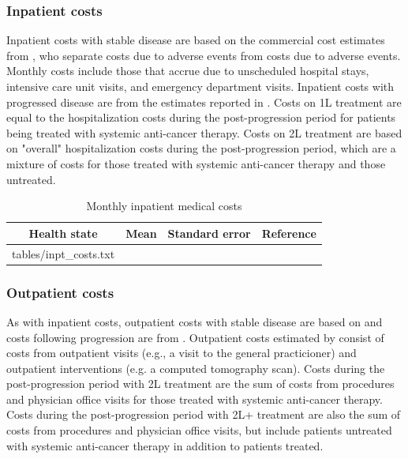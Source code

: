 \documentclass[11pt,final,fleqn]{article}\usepackage[]{graphicx}\usepackage[]{color}
\makeatletter
\theoremstyle{plain}
\newcommand*\ExpandableInput[1]{\@@input#1 }
\makeatother
\begin{document}
{\subsubsection{Inpatient costs}
Inpatient costs with stable disease are based on the commercial cost estimates from \citet{graham2018budget}, who separate costs due to adverse events from costs due to adverse events. Monthly costs include those that accrue due to unscheduled hospital stays, intensive care unit visits, and emergency department visits. Inpatient costs with progressed disease are from the estimates reported in \citet{skinner2018healthcare}. Costs on 1L treatment are equal to the hospitalization costs during the post-progression period for patients being treated with systemic anti-cancer therapy. Costs on 2L treatment are based on "overall" hospitalization costs during the post-progression period, which are a mixture of costs for those treated with systemic anti-cancer therapy and those untreated.    

\begin{table}[!ht]
\begin{center}
\begin{threeparttable}
\caption{Monthly inpatient medical costs} \label{tbl:inpt-costs}
\begin{tabularx}{\textwidth}{@{\extracolsep{\fill}}lrrl}
\hline
\multicolumn{1}{c}{Health state} & \multicolumn{1}{l}{Mean} & \multicolumn{1}{l}{Standard error} & \multicolumn{1}{l}{Reference}  \\
\hline
\ExpandableInput{tables/inpt_costs.txt}
\hline
\end{tabularx}
\scriptsize
\end{threeparttable}
\end{center}
\end{table}


\subsubsection{Outpatient costs}
As with inpatient costs, outpatient costs with stable disease are based on \citet{graham2018budget} and costs following progression are from \citet{skinner2018healthcare}. Outpatient costs estimated by \citet{graham2018budget} consist of costs from outpatient visits (e.g., a visit to the general practicioner) and outpatient interventions (e.g. a computed tomography scan). Costs during the post-progression period with 2L treatment are the sum of costs from procedures and physician office visits for those treated with systemic anti-cancer therapy. Costs during the post-progression period with 2L+ treatment are also the sum of costs from procedures and physician office visits, but include patients untreated with systemic anti-cancer therapy in addition to patients treated.

}
\end{document}

